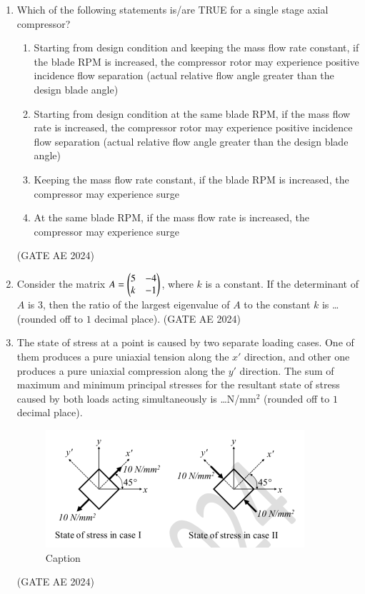 \documentclass[journal,12pt,onecolumn]{IEEEtran}
\theoremstyle{remark}
\begin{document}
\begin{enumerate}
\item Which of the following statements is/are TRUE for a single stage axial compressor?
\begin{enumerate}
    \item Starting from design condition and keeping the mass flow rate constant, if the blade RPM is increased, the compressor rotor may experience positive incidence flow separation (actual relative flow angle greater than the design blade angle)
    \item Starting from design condition at the same blade RPM, if the mass flow rate is increased, the compressor rotor may experience positive incidence flow separation (actual relative flow angle greater than the design blade angle)
    \item Keeping the mass flow rate constant, if the blade RPM is increased, the compressor may experience surge
    \item At the same blade RPM, if the mass flow rate is increased, the compressor may experience surge
\end{enumerate}
\hfill(GATE AE 2024)

\item Consider the matrix $A = \myvec{ 5 & -4 \\ k & -1 }$, where $k$ is a constant. If the determinant of $A$ is $3$, then the ratio of the largest eigenvalue of $A$ to the constant $k$ is \dots (rounded off to $1$ decimal place).
\hfill(GATE AE 2024)

\item The state of stress at a point is caused by two separate loading cases. One of them produces a pure uniaxial tension along the $x'$ direction, and other one produces a pure uniaxial compression along the $y'$ direction. The sum of maximum and minimum principal stresses for the resultant state of stress caused by both loads acting simultaneously is \dots N/mm$^2$ (rounded off to $1$ decimal place).
\begin{figure}[H]
    \centering
    \includegraphics[width=0.5\columnwidth]{figs/Screenshot 2025-08-24 062517.png}
    \caption{Caption}
    \label{fig:placeholder}
\end{figure}
\hfill(GATE AE 2024)


\end{enumerate}
\end{document}
